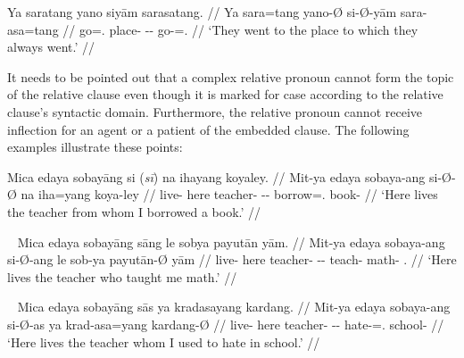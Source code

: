 \a\label{ex:reldat}\begingl
	\gla Ya saratang yano siyām sarasatang. //
	\glb Ya sara=tang yano-Ø si-Ø-yām sara-asa=tang //
	\glc \LocT{} go=\TplM{}.\Aarg{} place-\Top{} \Rel{}-\Loc{}-\Dat{} 
		go-\Hab{}=\TplM{}.\Aarg{} //
	\glft `They went to the place to which they always went.' //
\endgl
\xe

It needs to be pointed out that a complex relative pronoun cannot form 
the topic of the relative clause even though it is marked for case according to 
the relative clause's syntactic domain. Furthermore, the relative pronoun 
cannot receive inflection for an agent or a patient of the embedded clause. The 
following examples illustrate these points:

\pex\label{ex:reltop}
\ljudge* \begingl
	\gla Mica edaya sobayāng {si \textup{(\ques{}\textit{sī})}} na ihayang 
		koyaley. //
	\glb Mit-ya edaya sobaya-ang si-Ø-Ø na iha=yang koya-ley //
	\glc live-\TsgM{} here teacher-\Aarg{} \Rel{}-\Aarg{}-\Top{} \GenT{} 
		borrow=\Fsg{}.\Aarg{} book-\PargI{} //
% 
	\glft `Here lives the teacher from whom I borrowed a book.' //
\endgl
\xe

\pex~\label{ex:relagt}
\ljudge* \begingl
	\gla Mica edaya sobayāng sāng le sobya payutān yām. //
	\glb Mit-ya edaya sobaya-ang si-Ø-ang le sob-ya payutān-Ø yām //
	\glc live-\TsgM{} here teacher-\Aarg{} \Rel{}-\Aarg{}-\Aarg{} \PatTI{} 
		teach-\TsgM{} math-\Top{} \Fsg{}.\Dat{} //
% 
	\glft `Here lives the teacher who taught me math.' //
\endgl
\xe

\pex~\label{ex:relpat}
\ljudge* \begingl
	\gla Mica edaya sobayāng sās ya kradasayang kardang. //
	\glb Mit-ya edaya sobaya-ang si-Ø-as ya krad-asa=yang kardang-Ø //
	\glc live-\TsgM{} here teacher-\Aarg{} \Rel{}-\Aarg{}-\Parg{} \LocT{}
		hate-\Hab{}=\Fsg{}.\Aarg{} school-\Top{} //
% 
	\glft `Here lives the teacher whom I used to hate in school.' //
\endgl
\xe

